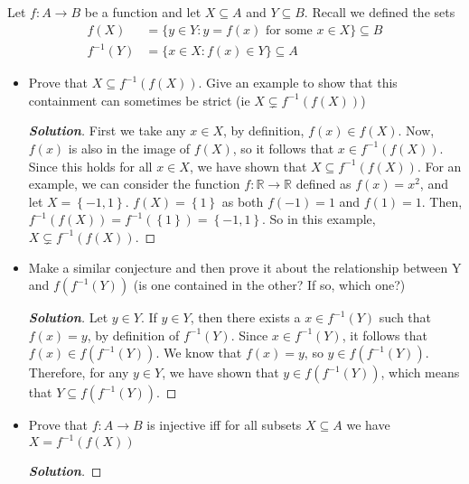 \documentclass[11pt]{article}
\newenvironment{problem}[2][Problem\!]{\begin{trivlist}
\item[\hskip \labelsep {\bfseries #1}\hskip \labelsep {\bfseries #2.}]}{\end{trivlist}}
\newenvironment{solution}{\begin{proof}[\textbf{\textit{Solution}}]}{\end{proof}}
\newcommand{\set}[1]{\left\{#1\right\}} %
\begin{document}
\begin{problem}{8.3}
 Let \(f: A \to B\) be a function and let \(X \subseteq A\) and \(Y \subseteq B\). Recall we defined the sets \begin{align*}
        f(X) & = \{ y \in Y : y=f(x) \text{ for some } x \in X\} \subseteq B\\
        f^{-1}(Y) & = \{x \in X : f(x) \in Y \} \subseteq A
\end{align*}
\begin{itemize}[itemsep=3em]
    \item[(a)] Prove that \(X \subseteq f^{-1}(f(X)) \). Give an example to show that this containment can sometimes be strict (ie \( X \subsetneq f^{-1}(f(X))\))
    \begin{solution}
    First we take any \(x \in X\), by definition, \(f(x) \in f(X)\). Now, \(f(x)\) is also in the image of \(f(X)\), so it follows that \(x \in f^{-1}(f(X))\). Since this holds for all \(x \in X\), we have shown that \(X \subseteq f^{-1}(f(X))\). For an example, we can consider the function \(f: \mathbb{R} \to \mathbb{R}\) defined as \(f(x) = x^2\), and let \(X = \set{-1,1}\). \(f(X) = \set{1}\) as both \(f(-1) = 1\) and \(f(1) = 1\). Then, \(f^{-1}(f(X)) = f^{-1}(\set{1}) = \set{-1,1}\).  So in this example, \(X \subsetneq f^{-1}(f(X))\).
    \end{solution}
    \item [(b)] Make a similar conjecture and then prove it about the relationship between Y and \(f(f^{-1}(Y))\) (is one contained in the other? If so, which one?)
    \begin{solution}
    Let \(y \in Y\). If \(y \in Y\), then there exists a \(x \in f^{-1}(Y)\) such that \(f(x) = y\), by definition of \(f^{-1}(Y)\). Since \(x \in f^{-1}(Y)\), it follows that \(f(x) \in f(f^{-1}(Y))\). We know that \(f(x) = y\), so \(y \in f(f^{-1}(Y))\). Therefore, for any \(y \in Y\), we have shown that \(y \in f(f^{-1}(Y))\), which means that \(Y \subseteq f(f^{-1}(Y))\).
    \end{solution}
    \item [(c)] Prove that \(f: A \to B\) is injective iff for all subsets \(X \subseteq A\) we have \(X = f^{-1}(f(X)) \)
    \begin{solution}

\end{solution}
\end{itemize}
\end{problem}
\end{document}
